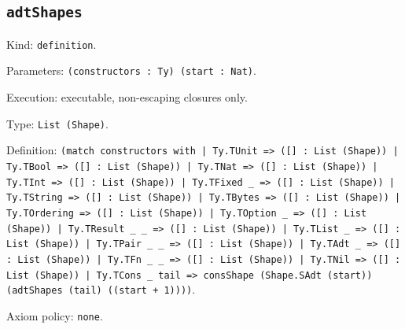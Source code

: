 \documentclass[11pt]{article}
\begin{document}
\subsection*{\texttt{adtShapes}}
\noindent Kind: \texttt{definition}.\par
\noindent Parameters: \texttt{(constructors : Ty) (start : Nat)}.\par
\noindent Execution: executable, non-escaping closures only.\par
\noindent Type: \texttt{List (Shape)}.\par
\noindent Definition: \texttt{(match constructors with | Ty.TUnit => ([] : List (Shape)) | Ty.TBool => ([] : List (Shape)) | Ty.TNat => ([] : List (Shape)) | Ty.TInt => ([] : List (Shape)) | Ty.TFixed \_ => ([] : List (Shape)) | Ty.TString => ([] : List (Shape)) | Ty.TBytes => ([] : List (Shape)) | Ty.TOrdering => ([] : List (Shape)) | Ty.TOption \_ => ([] : List (Shape)) | Ty.TResult \_ \_ => ([] : List (Shape)) | Ty.TList \_ => ([] : List (Shape)) | Ty.TPair \_ \_ => ([] : List (Shape)) | Ty.TAdt \_ => ([] : List (Shape)) | Ty.TFn \_ \_ => ([] : List (Shape)) | Ty.TNil => ([] : List (Shape)) | Ty.TCons \_ tail => consShape (Shape.SAdt (start)) (adtShapes (tail) ((start + 1))))}.\par
\noindent Axiom policy: \texttt{none}.\par
\end{document}
